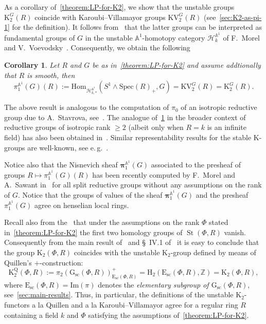 \documentclass[oneside, 11pt]{amsart} \pdfoutput=1
\newcommand{\K}{{\mathrm{K}}}
\newcommand{\St}{\mathop{\mathrm{St}}\nolimits}
\newcommand{\E}{\mathrm{E}}
\newcommand{\Gsc}{\mathrm{G}_\mathrm{sc}}
\numberwithin{equation}{section}
\newtheorem{corollary}[lemma]{Corollary}
\theoremstyle{definition}
\newcommand{\ZZ}{\mathbb{Z}}
\begin{document}
As a corollary of~\cref{theorem:LP-for-K2}, we show that the unstable groups $\K_2^G(R)$ coincide with Karoubi--Villamayor groups $\mathrm{KV}_2^G(R)$ (see~\cref{sec:K2-as-pi-1} for the definition). It follows from~\cite{AHW18} that the latter groups can be interpreted as fundamental groups of $G$ in the unstable $\mathbb{A}^1$-homotopy category $\mathcal{H}^{\mathbb{A}^1}_{k}$ of F.~Morel and V.~Voevodsky~\cite{MV99}. Consequently, we obtain the following
\begin{corollary} \label{cor:motivic-pi1} Let $R$ and $G$ be as in~\cref{theorem:LP-for-K2} and assume addtionally that $R$ is smooth, then
\[ \pi_1^{\mathbb{A}^1}(G)(R) := \mathrm{Hom}_{\mathcal{H}^{\mathbb{A}^1}_{k,*}}(S^1 \wedge \mathrm{Spec}(R)_+, G) = \mathrm{KV}_2^{G}(R) = \K_2^G(R).\]
\end{corollary}
The above result is analogous to the computation of $\pi_0$ of an isotropic reductive group due to A.~Stavrova, see~\cite[Theorem~5.5]{Sta20}. The analogue of~\cref{cor:motivic-pi1} in the broader context of reductive groups of isotropic rank $\geq 2$ (albeit only when $R = k$ is an infinite field) has also been obtained in~\cite{VW16}.
Similar representability results for the stable $\K$-groups are well-known, see e.\,g.~\cite{MV99, Ho05}.

Notice also that the Nisnevich sheaf $\bm{\pi}_1^{\mathbb{A}^1}(G)$ associated to the presheaf of groups $R \mapsto \pi_1^{\mathbb{A}^1}(G)(R)$ has been recently computed by F.~Morel and A.~Sawant in~\cite{MS20} for all split reductive groups without any assumptions on the rank of $G$. Notice that the groups of values of the sheaf $\bm{\pi}_1^{\mathbb{A}^1}(G)$ and the presheaf $\pi_1^{\mathbb{A}^1}(G)$ agree on henselian local rings.

Recall also from the~\cite[Theorem~5.3]{St71} that under the assumptions on the rank $\Phi$ stated in~\cref{theorem:LP-for-K2} the first two homology groups of $\St(\Phi, R)$ vanish. Consequently from the main result of~\cite{LSV20} and \S~IV.1 of~\cite{Kbook} it is easy to conclude that the group $\K_2(\Phi, R)$ coincides with the unstable $\K_2$-group defined by means of Quillen's $+$-construction:
\begin{equation} \label{eq:H2-K2}
  \K_2^\mathrm{Q}(\Phi, R) := \pi_2(\Gsc(\Phi, R))^+_{\E_\mathrm{sc}(\Phi, R)} = \mathrm{H}_2(\mathrm{E}_\mathrm{sc}(\Phi, R), \ZZ) = \K_2(\Phi, R),
\end{equation}
where $\E_\mathrm{sc}(\Phi, R) = \mathrm{Im}(\pi)$ denotes the {\it elementary subgroup of $\Gsc(\Phi, R)$}, see~\cref{sec:main-results}. Thus, in particular, the definitions of the unstable $\K_2$-functors a la Quillen and a la Karoubi--Villamayor agree for a regular ring $R$ containing a field $k$ and $\Phi$ satisfying the assumptions of~\cref{theorem:LP-for-K2}.
\end{document}
